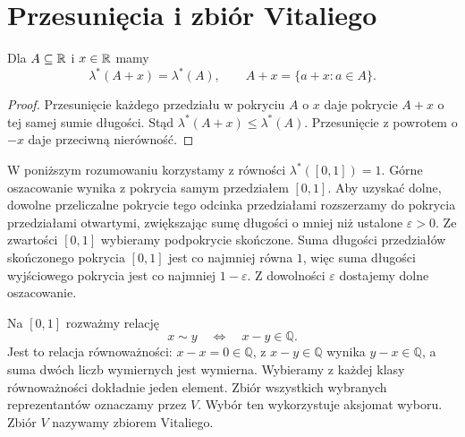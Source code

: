 \clearpage
{}
\section{Przesunięcia i zbiór Vitaliego}
\label{sec:vitali}

\begin{fakt}
\label{fakt:zewnetrzna-przesuniecia}
Dla $A\subseteq\mathbb{R}$ i $x\in\mathbb{R}$ mamy
\begin{equation}
  \lambda^{\ast}(A+x)=\lambda^{\ast}(A),
  \qquad A+x=\{a+x:a\in A\}.
  \label{eq:zewnetrzna-przesuniecia}
\end{equation}
\end{fakt}

\begin{proof}
Przesunięcie każdego przedziału w pokryciu $A$ o $x$ daje pokrycie
$A+x$ o tej samej sumie długości. Stąd
$\lambda^{\ast}(A+x)\leq\lambda^{\ast}(A)$.
Przesunięcie z powrotem o $-x$ daje przeciwną nierówność.
\end{proof}

\begin{uwaga}
\label{uw:dlugosc-przedzialu-vitali}
W poniższym rozumowaniu korzystamy z równości
$\lambda^{\ast}([0,1])=1$.
Górne oszacowanie wynika z pokrycia samym przedziałem $[0,1]$.
Aby uzyskać dolne, dowolne przeliczalne pokrycie tego odcinka przedziałami
rozszerzamy do pokrycia przedziałami otwartymi, zwiększając sumę długości
o mniej niż ustalone $\varepsilon>0$.
Ze zwartości $[0,1]$ wybieramy podpokrycie skończone.
Suma długości przedziałów skończonego pokrycia $[0,1]$ jest co najmniej
równa $1$, więc suma długości wyjściowego pokrycia jest co najmniej
$1-\varepsilon$. Z dowolności $\varepsilon$ dostajemy dolne oszacowanie.
\end{uwaga}

\begin{przyklad}
\label{prz:vitali}
Na $[0,1]$ rozważmy relację
\begin{equation}
  x\sim y\quad\Longleftrightarrow\quad x-y\in\mathbb{Q}.
  \label{eq:relacja-vitaliego}
\end{equation}
Jest to relacja równoważności: $x-x=0\in\mathbb{Q}$,
z $x-y\in\mathbb{Q}$ wynika $y-x\in\mathbb{Q}$,
a suma dwóch liczb wymiernych jest wymierna.
Wybieramy z każdej klasy równoważności dokładnie jeden element.
Zbiór wszystkich wybranych reprezentantów oznaczamy przez $V$.
Wybór ten wykorzystuje aksjomat wyboru. Zbiór $V$ nazywamy zbiorem Vitaliego.
\end{przyklad}

